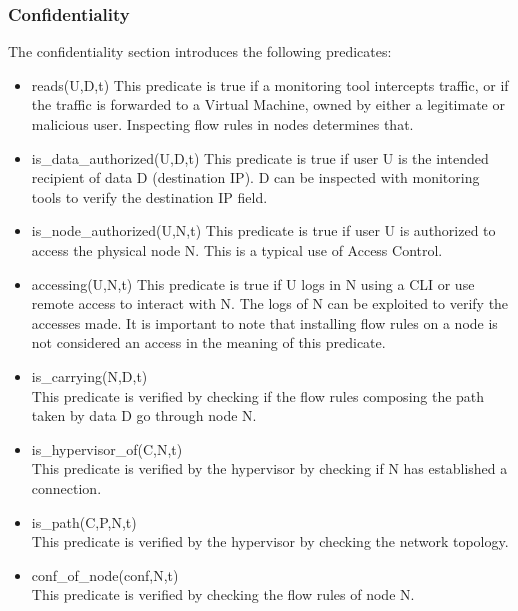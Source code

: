 \subsubsection{Confidentiality}
The confidentiality section introduces the following predicates:
\begin{itemize}
\item reads(U,D,t)
\newline
This predicate is true if a monitoring tool intercepts traffic, or if the traffic is forwarded to a Virtual Machine, owned by either a legitimate or malicious user. Inspecting flow rules in nodes determines that. 

\item is\_data\_authorized(U,D,t)
\newline
This predicate is true if user U is the intended recipient of data D (\eg destination IP).
D can be inspected with monitoring tools to verify the destination IP field.
\item is\_node\_authorized(U,N,t)
\newline
This predicate is true if user U is authorized to access the physical node N.
This is a typical use of Access Control.
\item accessing(U,N,t)
\newline
This predicate is true if U logs in N using a CLI or use remote access to interact with N.
The logs of N can be exploited to verify the accesses made.
It is important to note that installing flow rules on a node is not considered an access in the meaning of this predicate.

\item is\_carrying(N,D,t)\\
This predicate is verified by checking if the flow rules composing the path taken by data D go through node N.

\item is\_hypervisor\_of(C,N,t)\\
This predicate is verified by the hypervisor by checking if N has established a connection.

\item is\_path(C,P,N,t)\\
This predicate  is verified by the hypervisor by checking the network topology.

\item conf\_of\_node(conf,N,t)\\
This predicate  is verified by checking the flow rules of node N.

\end{itemize}

